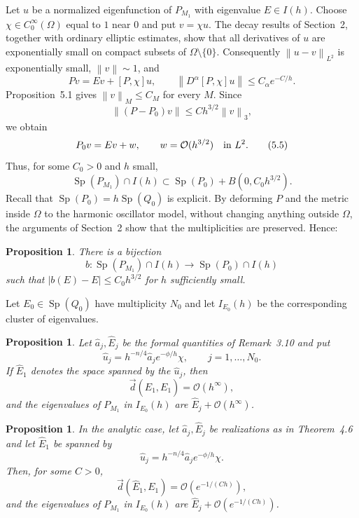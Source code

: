 \documentclass[11pt,a4paper]{article}
\newcommand{\Sp}{\operatorname{Sp}}
\newcommand{\cO}{\mathcal O}
\newcommand{\norm}[1]{\left\lVert #1\right\rVert}
\newcommand{\dvec}{\overset{\rightarrow}{d}}
\numberwithin{equation}{section}
\newtheorem{proposition}[theorem]{Proposition}
\theoremstyle{remark}
\begin{document}
Let $u$ be a normalized eigenfunction of $P_{M_1}$ with eigenvalue $E\in I(h)$. Choose $\chi\in C_0^\infty(\Omega)$ equal to $1$ near $0$ and put $v=\chi u$. The decay results of Section~2, together with ordinary elliptic estimates, show that all derivatives of $u$ are exponentially small on compact subsets of $\Omega\setminus\{0\}$. Consequently $\norm{u-v}_{L^2}$ is exponentially small, $\norm v\sim1$, and
\[
Pv=Ev+[P,\chi]u,
\qquad
\norm{D^\alpha[P,\chi]u}\le C_\alpha e^{-C/h}.
\]
Proposition~5.1 gives $\norm v_M\le C_M$ for every $M$. Since
\[
\norm{(P-P_0)v}\le C h^{3/2}\norm v_3,
\]
we obtain
\begin{equation}
P_0v=Ev+w,
\qquad w=\cO(h^{3/2})\quad\hbox{in }L^2.
\tag{5.5}
\end{equation}
Thus, for some $C_0>0$ and $h$ small,
\begin{equation}
\Sp(P_{M_1})\cap I(h)
\subset \Sp(P_0)+B(0,C_0h^{3/2}).
\tag{5.6}
\end{equation}
Recall that $\Sp(P_0)=h\Sp(Q_0)$ is explicit. By deforming $P$ and the metric inside $\Omega$ to the harmonic oscillator model, without changing anything outside $\Omega$, the arguments of Section~2 show that the multiplicities are preserved. Hence:

\begin{proposition}
There is a bijection
\[
b:\Sp(P_{M_1})\cap I(h)\longrightarrow \Sp(P_0)\cap I(h)
\]
such that $|b(E)-E|\le C_0h^{3/2}$ for $h$ sufficiently small.
\end{proposition}

Let $E_0\in\Sp(Q_0)$ have multiplicity $N_0$ and let $I_{E_0}(h)$ be the corresponding cluster of eigenvalues.

\begin{proposition}
Let $\widehat a_j,\widehat E_j$ be the formal quantities of Remark~3.10 and put
\[
\widehat u_j=h^{-n/4}\widehat a_j e^{-\phi/h}\chi,
\qquad j=1,\ldots,N_0.
\]
If $\widehat E_1$ denotes the space spanned by the $\widehat u_j$, then
\[
\dvec(\widehat E_1,E_1)=\cO(h^\infty),
\]
and the eigenvalues of $P_{M_1}$ in $I_{E_0}(h)$ are
$\widehat E_j+\cO(h^\infty)$.
\end{proposition}

\begin{proposition}
In the analytic case, let $\widehat a_j,\widehat E_j$ be realizations as in Theorem~4.6 and let $\widehat E_1$ be spanned by
\[
\widehat u_j=h^{-n/4}\widehat a_j e^{-\phi/h}\chi.
\]
Then, for some $C>0$,
\[
\dvec(\widehat E_1,E_1)=\cO(e^{-1/(Ch)}),
\]
and the eigenvalues of $P_{M_1}$ in $I_{E_0}(h)$ are
$\widehat E_j+\cO(e^{-1/(Ch)})$.
\end{proposition}
\end{document}
